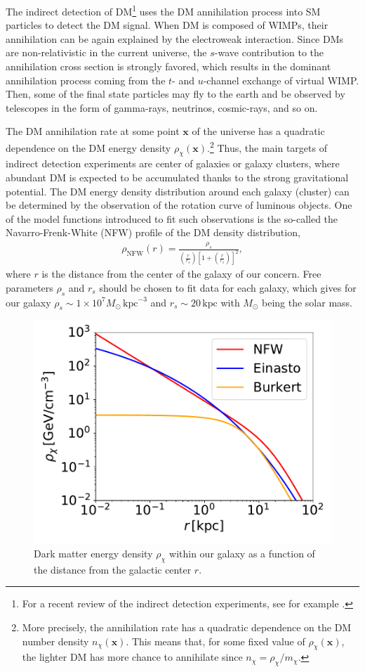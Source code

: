 \documentclass[12pt,twoside,book]{article}
\begin{document}
The indirect detection of DM\footnote{
  For a recent review of the indirect detection experiments, see for example \cite{Gaskins:2016cha}.
}
uses the DM annihilation process into SM particles to detect the DM signal.
When DM is composed of WIMPs, their annihilation can be again explained by the electroweak interaction.
Since DMs are non-relativistic in the current universe, the $s$-wave contribution to the annihilation cross section is strongly favored, which results in the dominant annihilation process coming from the $t$- and $u$-channel exchange of virtual WIMP.
Then, some of the final state particles may fly to the earth and be observed by telescopes in the form of gamma-rays, neutrinos, cosmic-rays, and so on.

The DM annihilation rate at some point $\bm{x}$ of the universe has a quadratic dependence on the DM energy density $\rho_\chi (\bm{x})$.\footnote{
  More precisely, the annihilation rate has a quadratic dependence on the DM number density $n_\chi (\bm{x})$.
  This means that, for some fixed value of $\rho_\chi (\bm{x})$, the lighter DM has more chance to annihilate since $n_\chi = \rho_\chi / m_\chi$.
}
Thus, the main targets of indirect detection experiments are center of galaxies or galaxy clusters, where abundant DM is expected to be accumulated thanks to the strong gravitational potential.
The DM energy density distribution around each galaxy (cluster) can be determined by the observation of the rotation curve of luminous objects.
One of the model functions introduced to fit such observations is the so-called the Navarro-Frenk-White (NFW) profile \cite{Navarro:1995iw, Navarro:1996gj} of the DM density distribution,
\begin{align}
  \rho_{\mathrm{NFW}} (r) = \frac{\rho_s}
  { \left( \frac{r}{r_s} \right) \left[ 1 + \left( \frac{r}{r_s} \right) \right]^2},
\end{align}
where $r$ is the distance from the center of the galaxy of our concern.
Free parameters $\rho_s$ and $r_s$ should be chosen to fit data for each galaxy, which gives for our galaxy $\rho_s \sim 1\times 10^7 M_\odot\, \mathrm{kpc}^{-3}$ and $r_s \sim 20\,\mathrm{kpc}$ \cite{Fornasa:2013iaa} with $M_\odot$ being the solar mass.

\begin{figure}
  \centering
  \includegraphics[width=0.5\hsize]{profile.pdf}
  \caption{
    Dark matter energy density $\rho_\chi$ within our galaxy as a function of the distance from the galactic center $r$.
  }
  \label{fig:profile}
\end{figure}
\end{document}
